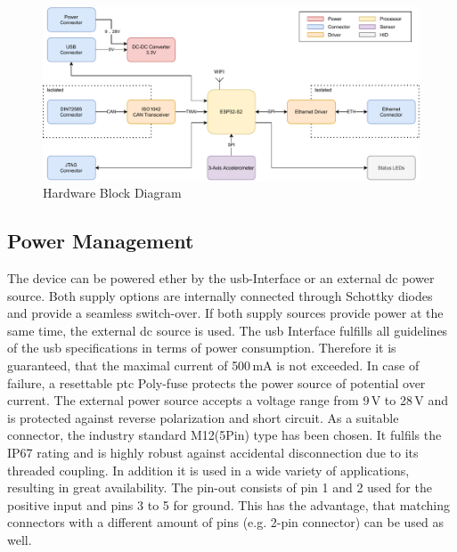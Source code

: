 \medskip
\begin{figure}[h!]
	\centering
	\includegraphics[width=\textwidth]{images/fleet_monitor_hardware}
	\vspace{0.1cm}
	\caption{Hardware Block Diagram}
	\label{fig:hardware-block-diagram}
\end{figure}

\subsection{Power Management}
The device can be powered ether by the \acrshort{usb}-Interface or an external \acrshort{dc} power source. Both supply options are internally connected through Schottky diodes and provide a seamless switch-over. If both supply sources provide power at the same time, the external \acrshort{dc} source is used.\newline
The \acrfull{usb} Interface fulfills all guidelines of the \acrshort{usb} specifications in terms of power consumption. Therefore it is guaranteed, that the maximal current of 500\,mA is not exceeded. In case of failure, a resettable \acrshort{ptc} Poly-fuse protects the power source of potential over current.\newline
The external power source accepts a voltage range from 9\,V to 28\,V and is protected against reverse polarization and short circuit. As a suitable connector, the industry standard M12\;(5\;Pin) type has been chosen. It fulfils the IP67 rating and is highly robust against accidental disconnection due to its threaded coupling. In addition it is used in a wide variety of applications, resulting in great availability. The pin-out consists of pin 1 and 2 used for the positive input and pins 3 to 5 for ground. This has the advantage, that matching connectors with a different amount of pins (e.g. 2-pin connector) can be used as well.

